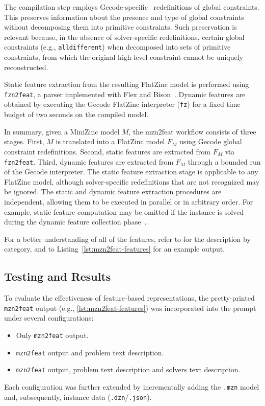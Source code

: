 \documentclass[../../main]{subfiles}
\begin{document}
The compilation step employs Gecode-specific~\cite{Gecode} redefinitions of global constraints. This preserves information about the presence and type of global constraints without decomposing them into primitive constraints. Such preservation is relevant because, in the absence of solver-specific redefinitions, certain global constraints (e.g., \texttt{alldifferent}) when decomposed into sets of primitive constraints, from which the original high-level constraint cannot be uniquely reconstructed.

Static feature extraction from the resulting FlatZinc model is performed using \texttt{fzn2feat}, a parser implemented with Flex and Bison~\cite{FlexBison}. Dynamic features are obtained by executing the Gecode FlatZinc interpreter (\texttt{fz}) for a fixed time budget of two seconds on the compiled model.

In summary, given a MiniZinc model $M$, the mzn2feat workflow consists of three stages. First, $M$ is translated into a FlatZinc model $F_M$ using Gecode global constraint redefinitions. Second, static features are extracted from $F_M$ via \texttt{fzn2feat}. Third, dynamic features are extracted from $F_M$ through a bounded run of the Gecode interpreter. The static feature extraction stage is applicable to any FlatZinc model, although solver-specific redefinitions that are not recognized may be ignored. The static and dynamic feature extraction procedures are independent, allowing them to be executed in parallel or in arbitrary order. For example, static feature computation may be omitted if the instance is solved during the dynamic feature collection phase~\cite{mzn2feat}.

For a better understanding of all of the features, refer to  for the description by category, and to Listing~\ref{lst:mzn2feat-features} for an example output.

\subsection{Testing and Results}
To evaluate the effectiveness of feature-based representations, the pretty-printed \texttt{mzn2feat} output (e.g., \ref{lst:mzn2feat-features}) was incorporated into the prompt under several configurations:
\begin{itemize}
    \item Only \texttt{mzn2feat} output.
    \item \texttt{mzn2feat} output and problem text description.
    \item \texttt{mzn2feat} output, problem text description and solvers text description.
\end{itemize}
Each configuration was further extended by incrementally adding the \texttt{.mzn} model and, subsequently, instance data (\texttt{.dzn}/\texttt{.json}).
\end{document}
